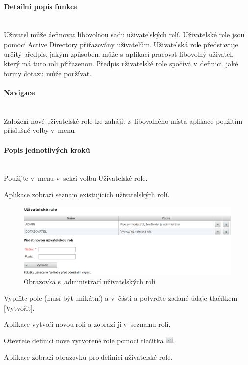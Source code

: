 \documentclass[thesis=M,czech]{FITthesis}[2019/12/23]
\newcommand{\lbparagraph}[1]{\paragraph{#1}\mbox{}\\} %
\begin{document}
\lbparagraph{Detailní popis funkce}
Uživatel může definovat libovolnou sadu uživatelských rolí. Uživatelské role jsou pomocí Active Directory přiřazovány uživatelům. Uživatelská role představuje určitý předpis, jakým způsobem může s~aplikací pracovat libovolný uživatel, který má tuto roli přiřazenou. Předpis uživatelské role spočívá v~definici, jaké formy dotazu může používat.

\lbparagraph{Navigace}
Založení nové uživatelské role lze zahájit z~libovolného místa aplikace použitím příslušné volby v~menu.

\lbparagraph{Popis jednotlivých kroků}
Použijte v~menu v~sekci  volbu Uživatelské role.

Aplikace zobrazí seznam existujících uživatelských rolí.

\begin{figure}[H]
  \centering
  \includegraphics[width=\textwidth]{res/guide/UserRoles.png}
  \caption{Obrazovka s~administrací uživatelských rolí}
  \label{fig:Obrazovka s~administrací uživatelských rolí}
\end{figure}

Vyplňte pole  (musí být unikátní) a  v~části  a potvrďte zadané údaje tlačítkem [Vytvořit].

Aplikace vytvoří novou roli a zobrazí ji v~seznamu rolí.

Otevřete definici nově vytvořené role pomocí tlačítka \includegraphics[height=1em]{res/guide/SearchIcon.png}.

Aplikace zobrazí obrazovku pro definici uživatelské role.
\end{document}
